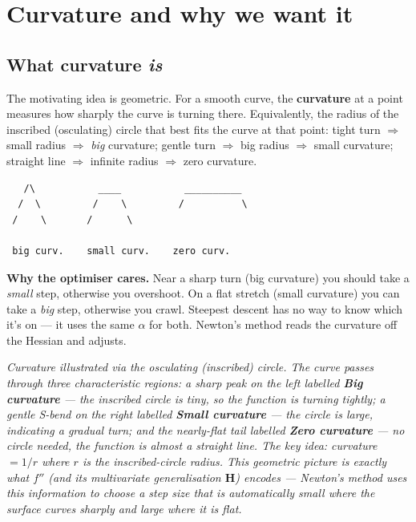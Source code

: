 \documentclass[11pt, a4paper]{article}
\begin{document}
\section{Curvature and why we want it}

\subsection{What curvature \emph{is}}

The motivating idea is geometric. For a smooth curve, the \textbf{curvature} at a point measures how sharply the curve is turning there. Equivalently, the radius of the inscribed (osculating) circle that best fits the curve at that point: tight turn $\Rightarrow$ small radius $\Rightarrow$ \emph{big} curvature; gentle turn $\Rightarrow$ big radius $\Rightarrow$ small curvature; straight line $\Rightarrow$ infinite radius $\Rightarrow$ zero curvature.

\begin{verbatim}
   /\           ____           __________
  /  \         /    \         /          \
 /    \       /      \

 big curv.    small curv.    zero curv.
\end{verbatim}

\textbf{Why the optimiser cares.} Near a sharp turn (big curvature) you should take a \emph{small} step, otherwise you overshoot. On a flat stretch (small curvature) you can take a \emph{big} step, otherwise you crawl. Steepest descent has no way to know which it's on — it uses the same $\alpha$ for both. Newton's method reads the curvature off the Hessian and adjusts.

\begin{center}

\footnotesize\textit{Curvature illustrated via the osculating (inscribed) circle. The curve passes through three characteristic regions: a sharp peak on the left labelled \textbf{Big curvature} --- the inscribed circle is tiny, so the function is turning tightly; a gentle S-bend on the right labelled \textbf{Small curvature} --- the circle is large, indicating a gradual turn; and the nearly-flat tail labelled \textbf{Zero curvature} --- no circle needed, the function is almost a straight line. The key idea: curvature $= 1 / r$ where $r$ is the inscribed-circle radius. This geometric picture is exactly what $f''$ (and its multivariate generalisation $\mathbf{H}$) encodes --- Newton's method uses this information to choose a step size that is automatically small where the surface curves sharply and large where it is flat.}
\end{center}
\end{document}
